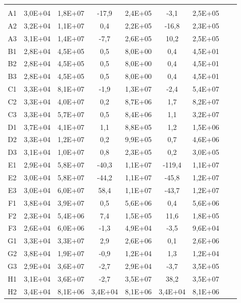 \begin{center}
\begin{longtable}{ccccccccc}
\toprule
\endhead
\midrule \\ %
\endfoot
\bottomrule 
\endlastfoot
A1    & 3,0E+04 & 1,8E+07 & -17,9 & 2,4E+05 & -3,1  & 2,5E+05 \\
A2    & 3,2E+04 & 1,1E+07 & 0,4   & 2,2E+05 & -16,8 & 2,3E+05 \\
A3    & 3,1E+04 & 1,4E+07 & -7,7  & 2,6E+05 & 10,2  & 2,5E+05 \\
B1    & 2,8E+04 & 4,5E+05 & 0,5   & 8,0E+00 & 0,4   & 4,5E+01 \\
B2    & 2,8E+04 & 4,5E+05 & 0,5   & 8,0E+00 & 0,4   & 4,5E+01 \\
B3    & 2,8E+04 & 4,5E+05 & 0,5   & 8,0E+00 & 0,4   & 4,5E+01 \\
C1    & 3,3E+04 & 8,1E+07 & -1,9  & 1,3E+07 & -2,4  & 5,4E+07 \\
C2    & 3,3E+04 & 4,0E+07 & 0,2   & 8,7E+06 & 1,7   & 8,2E+07 \\
C3    & 3,3E+04 & 5,7E+07 & 0,5   & 8,4E+06 & 1,1   & 3,2E+07 \\
D1    & 3,7E+04 & 4,1E+07 & 1,1   & 8,8E+05 & 1,2   & 1,5E+06 \\
D2    & 3,3E+04 & 1,2E+07 & 0,2   & 9,9E+05 & 0,7   & 4,6E+06 \\
D3    & 3,1E+04 & 1,0E+07 & 0,8   & 2,3E+05 & 0,2   & 3,0E+05 \\
E1    & 2,9E+04 & 5,8E+07 & -40,3 & 1,1E+07 & -119,4 & 1,1E+07 \\
E2    & 3,0E+04 & 5,8E+07 & -44,2 & 1,1E+07 & -45,8 & 1,2E+07 \\
E3    & 3,0E+04 & 6,0E+07 & 58,4  & 1,1E+07 & -43,7 & 1,2E+07 \\
F1    & 3,8E+04 & 3,9E+07 & 0,5   & 5,6E+06 & 0,4   & 5,6E+06 \\
F2    & 2,3E+04 & 5,4E+06 & 7,4   & 1,5E+05 & 11,6  & 1,8E+05 \\
F3    & 2,6E+04 & 6,0E+06 & -1,3  & 4,9E+04 & -3,5  & 9,6E+04 \\
G1    & 3,3E+04 & 3,3E+07 & 2,9   & 2,6E+06 & 0,1   & 2,6E+06 \\
G2    & 3,8E+04 & 1,9E+07 & -0,9  & 1,2E+04 & 1,3   & 1,2E+04 \\
G3    & 2,9E+04 & 3,6E+07 & -2,7  & 2,9E+04 & -3,7  & 3,5E+05 \\
H1    & 3,1E+04 & 3,6E+07 & -2,7  & 3,5E+07 & 38,2  & 3,5E+07 \\
H2    & 3,4E+04 & 8,1E+06 & 3,4E+04 & 8,1E+06 & 3,4E+04 & 8,1E+06 \\

\end{longtable}
\end{center}
